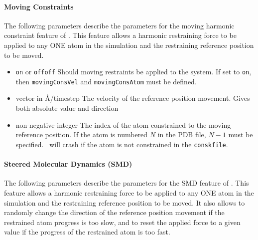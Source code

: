 \paragraph{Moving Constraints}
The following parameters describe the parameters for the 
moving harmonic constraint feature of \NAMD.  
This feature allows a harmonic restraining force to be applied
to any ONE atom in the simulation and the restraining reference
position to be moved.


\begin{itemize}

\item 
{}
{\verb!on! or \verb!off!}{\verb!off!}
{Should moving restraints be applied to the system. If set 
to \verb!on!, then  \verb!movingConsVel! and \verb!movingConsAtom!
must be defined.}

\item
{}
{vector in \AA/timestep}
{The velocity of the reference position movement. Gives both absolute
value and direction}

\item
{}
{non-negative integer}
{The index of the atom constrained to the moving reference position. 
If the atom is numbered $N$ in the PDB file, $N-1$ must be specified.
\NAMD\ will crash if the atom is not constrained in the
\verb!conskfile!.
}

\end{itemize}

\paragraph{Steered Molecular Dynamics (SMD)}
The following parameters describe the parameters for the 
SMD feature of \NAMD.
This feature allows a harmonic restraining force to be applied
to any ONE atom in the simulation and the restraining reference
position to be moved. It also allows to randomly change the direction
of the reference position movement if the restrained atom progress is
too slow, and to reset the applied force to a given value if the
progress of the restrained atom is too fast.

